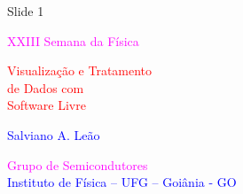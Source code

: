 % 
% 
% 
% 


\begin{slide}{Slide 1}

\begin{center}
\textcolor{magenta}{\huge XXIII Semana da Física}
\vspace{1.0cm}
\end{center}

{\Huge
\begin{center}
\textcolor{red}{Visualização e Tratamento}  \\
\textcolor{red}{de Dados com} \\
\textcolor{red}{Software Livre}
\end{center}
}

\begin{center}
\textcolor{blue}{\Large Salviano A. Leão}\\
\vfill

\textcolor{magenta}{\Large Grupo de Semicondutores}\\[0pt]
\vspace{1.0cm}
\textcolor{blue}{\large Instituto de Física -- UFG -- Goiânia - GO}\\[0pt]
\end{center}
\end{slide}